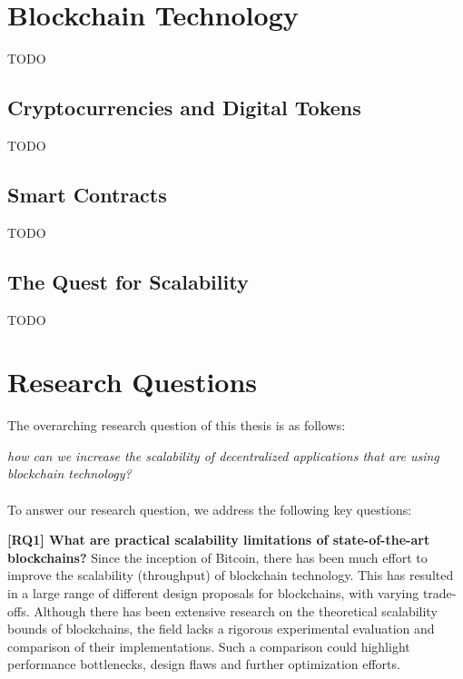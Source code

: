 \section{Blockchain Technology}
TODO

\subsection{Cryptocurrencies and Digital Tokens}
TODO

\subsection{Smart Contracts}
TODO

\subsection{The Quest for Scalability}
TODO


\section{Research Questions}

The overarching research question of this thesis is as follows:

\emph{how can we increase the scalability of decentralized applications that are using blockchain technology?}\\\\
To answer our research question, we address the following key questions:

\textbf{[RQ1] What are practical scalability limitations of state-of-the-art blockchains?}
Since the inception of Bitcoin, there has been much effort to improve the scalability (throughput) of blockchain technology.
This has resulted in a large range of different design proposals for blockchains, with varying trade-offs.
Although there has been extensive research on the theoretical scalability bounds of blockchains, the field lacks a rigorous experimental evaluation and comparison of their implementations.
Such a comparison could highlight performance bottlenecks, design flaws and further optimization efforts.

